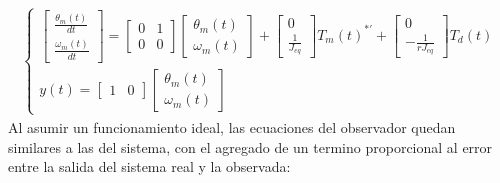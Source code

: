 \documentclass[a4paper, 10pt, onecolumn,journal]{ieeeconf}
\begin{document}
\begin{align}
	\begin{cases}
		\begin{bmatrix}
			\frac{\theta_m(t)}{dt} \\ 
			\frac{\omega_m(t)}{dt}
		\end{bmatrix} = 
		\begin{bmatrix}
			0 & 1 \\ 
			0 & 0
		\end{bmatrix}
		\begin{bmatrix}
			{\theta}_m(t) \\ 
			{\omega}_m(t)
		\end{bmatrix} + 
		\begin{bmatrix}
			0 \\ 
			\frac{1}{J_{eq}}
		\end{bmatrix} {T_m(t)}^{*'} +
		\begin{bmatrix}
			0 \\ 
			-\frac{1}{r J_{eq}}
		\end{bmatrix} T_d(t)\\
		y(t) = \begin{bmatrix}
			1 & 0
		\end{bmatrix} \begin{bmatrix}
		{\theta}_m(t) \\ 
		{\omega}_m(t)
		\end{bmatrix}
	\end{cases}\label{ecuacion matricial de subsistema mecanico compensado}
\end{align}
Al asumir un funcionamiento ideal, las ecuaciones del observador quedan similares a las del sistema, con el agregado de un termino proporcional al error entre la salida del sistema real y la observada:
\end{document}
